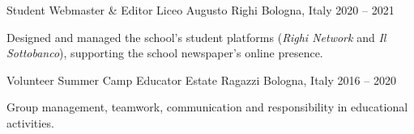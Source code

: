 \documentclass[11pt, a4paper]{../awesome-cv}
\begin{document}
\begin{cventries}
  \cventry
    {Student Webmaster \& Editor}
    {Liceo Augusto Righi}
    {Bologna, Italy}
    {2020 -- 2021}
    {
      \begin{cvitems}
        \item {Designed and managed the school's student platforms (\textit{Righi Network} and \textit{Il Sottobanco}), supporting the school newspaper's online presence.}
      \end{cvitems}
    }

  \cventry
    {Volunteer Summer Camp Educator}
    {Estate Ragazzi}
    {Bologna, Italy}
    {2016 -- 2020}
    {
      \begin{cvitems}
        \item {Group management, teamwork, communication and responsibility in educational activities.}
      \end{cvitems}
    }
\end{cventries}
\end{document}
